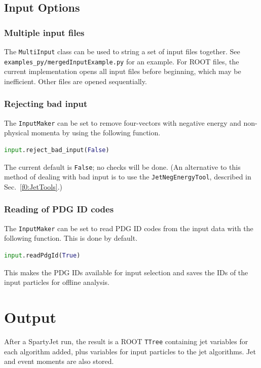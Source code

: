 \documentclass{article}
\newcommand{\prog}[1]{{\sc #1}\xspace}
\newcommand{\code}[1]{{\tt #1}\xspace}
\newcommand{\SJ}[0]{\prog{SpartyJet}}
\begin{document}
\subsection{Input Options}
\label{f0:inputoption} 

\subsubsection*{Multiple input files}

The \code{MultiInput} class can be used to string a set of input files together.  See \verb+examples_py/mergedInputExample.py+ for an example. For \prog{ROOT} files, the current implementation opens all input files before beginning, which may be inefficient.  Other files are opened sequentially.

\subsubsection*{Rejecting bad input}
The \code{InputMaker} can be set to remove four-vectors with negative energy and non-physical momenta by using the following function. 
\begin{lstlisting}[language=Python]
input.reject_bad_input(False)
\end{lstlisting}
The current default is \verb+False+; no checks will be done. (An alternative to this method of dealing with bad input is to use the \code{JetNegEnergyTool}, described in Sec.~\ref{f0:JetTools}.)

\subsubsection*{Reading of PDG ID codes}

The \code{InputMaker} can be set to read PDG ID codes from the input data with the following function.  This is done by default.
\begin{lstlisting}[language=Python]
input.readPdgId(True)
\end{lstlisting}
This makes the PDG IDs available for input selection and saves the IDs of the input particles for offline analysis.



\section{Output}
\label{f0:Output}

After a \SJ run, the result is a \prog{ROOT} \code{TTree} containing jet variables for each algorithm added, plus variables for input particles to the jet algorithms.  Jet and event moments are also stored.
\end{document}
